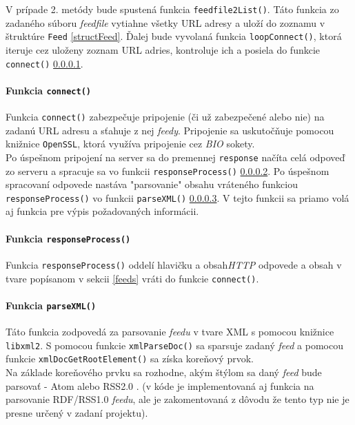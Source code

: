 \documentclass[a4paper, 11pt]{article}
\begin{document}
    V prípade 2. metódy bude spustená funkcia \texttt{feedfile2List()}. Táto funkcia zo zadaného súboru \textit{feedfile} vytiahne všetky URL adresy a uloží do zoznamu v štruktúre \texttt{Feed} \ref{structFeed}. Ďalej bude vyvolaná funkcia \texttt{loopConnect()}, ktorá iteruje cez uloženy zoznam URL adries, kontroluje ich a posiela do funkcie \texttt{connect()} \ref{connect}. \\

    \paragraph{Funkcia \texttt{connect()}}
    \label{connect}
    Funkcia \texttt{connect()} zabezpečuje pripojenie (či už zabezpečené alebo nie) na zadanú URL adresu a sťahuje z nej \textit{feedy}. Pripojenie sa uskutočňuje pomocou knižnice \texttt{OpenSSL}, ktorá využíva pripojenie cez \textit{BIO} sokety\cite{openSSL}. \\

    Po úspešnom pripojení na server sa do premennej \texttt{response} načíta celá odpoveď zo serveru a spracuje sa vo funkcii \texttt{responseProcess()} \ref{responseProc}. Po úspešnom spracovaní odpovede nastáva "parsovanie" obsahu vráteného funkciou \texttt{responseProcess()} vo funkcii \texttt{parseXML()} \ref{parse}. V tejto funkcii sa priamo volá aj funkcia pre výpis požadovaných informácii. \\

    \paragraph{Funkcia \texttt{responseProcess()}}
    \label{responseProc}
    Funkcia \texttt{responseProcess()} oddelí hlavičku a obsah\textit{HTTP} odpovede a obsah v tvare popísanom v sekcii \ref{feeds} vráti do funkcie \texttt{connect()}. 

    \paragraph{Funkcia \texttt{parseXML()}}
    \label{parse}
    Táto funkcia zodpovedá za parsovanie \textit{feedu} v tvare XML s pomocou knižnice \texttt{libxml2}. S pomocou funkcie \texttt{xmlParseDoc()} sa sparsuje zadaný \textit{feed} a pomocou funkcie \texttt{xmlDocGetRootElement()} sa získa koreňový prvok. \\
    
    Na základe koreňového prvku sa rozhodne, akým štýlom sa daný \textit{feed} bude parsovať - Atom alebo RSS2.0 . (v kóde je implementovaná aj funkcia na parsovanie RDF/RSS1.0 \textit{feedu}, ale je zakomentovaná z dôvodu že tento typ nie je presne určený v zadaní projektu).\\
\end{document}
